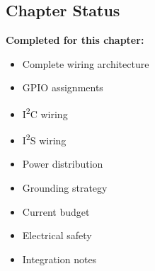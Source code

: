 \subsection{Chapter Status}
\label{sec:ch5-status}

\begin{validationbox}
\textbf{Completed for this chapter:}
\begin{itemize}
    \item Complete wiring architecture
    \item GPIO assignments
    \item I\textsuperscript{2}C wiring
    \item I\textsuperscript{2}S wiring
    \item Power distribution
    \item Grounding strategy
    \item Current budget
    \item Electrical safety
    \item Integration notes
\end{itemize}
\end{validationbox}
